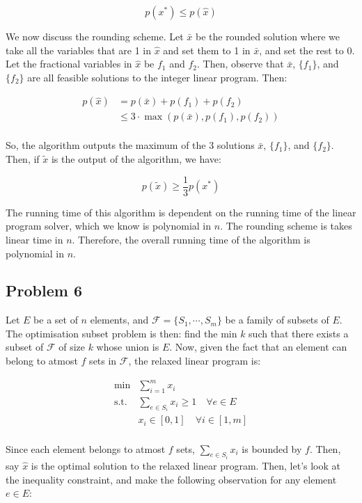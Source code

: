 \documentclass[a4paper]{article}
\begin{document}
\[ p(x^*) \leq p(\hat{x}) \]

\noindent
We now discuss the rounding scheme. Let $\bar{x}$ be the rounded solution where we take all the variables that are 1 in $\hat{x}$ and set them to 1 in $\bar{x}$, and set the rest to 0. Let the fractional variables in $\hat{x}$ be $f_1$ and $f_2$. Then, observe that $\bar{x}$, $\{ f_1 \}$, and $\{ f_2 \}$ are all feasible solutions to the integer linear program. Then:

\begin{align*}
    p(\hat{x}) & = p(\bar{x}) + p(f_1) + p(f_2) \\
    & \leq 3 \cdot \max(p(\bar{x}), p(f_1), p(f_2)) \\
\end{align*}

\noindent
So, the algorithm outputs the maximum of the 3 solutions $\bar{x}$, $\{ f_1 \}$, and $\{ f_2 \}$. Then, if $\tilde{x}$ is the output of the algorithm, we have:

\[ p(\tilde{x}) \geq \frac{1}{3} p(x^*) \]

\noindent
The running time of this algorithm is dependent on the running time of the linear program solver, which we know is polynomial in $n$. The rounding scheme is takes linear time in $n$. Therefore, the overall running time of the algorithm is polynomial in $n$.


\newpage
\subsection*{Problem 6}
Let $E$ be a set of $n$ elements, and $\mathcal{F} = \{S_1, \cdots, S_m\}$ be a family of subsets of $E$. The optimisation subset problem is then: find the min $k$ such that there exists a subset of $\mathcal{F}$ of size $k$ whose union is $E$. Now, given the fact that an element can belong to atmost $f$ sets in $\mathcal{F}$, the relaxed linear program is:

\begin{align*}
\text{min} & \sum_{i=1}^{m} x_i \\
\text{s.t.} & \sum_{e \in S_i} x_i \geq 1 \quad \forall e \in E \\
& x_i \in [0, 1] \quad \forall i \in [1, m] \\
\end{align*}

\noindent
Since each element belongs to atmost $f$ sets, $\sum_{e \in S_i} x_i$ is bounded by $f$. Then, say $\hat{x}$ is the optimal solution to the relaxed linear program. Then, let's look at the inequality constraint, and make the following observation for any element $e \in E$:
\end{document}
